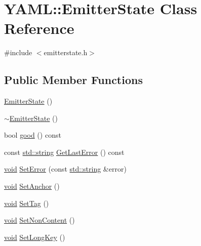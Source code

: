\hypertarget{class_y_a_m_l_1_1_emitter_state}{}\section{Y\+A\+ML\+::Emitter\+State Class Reference}
\label{class_y_a_m_l_1_1_emitter_state}


{\ttfamily \#include $<$emitterstate.\+h$>$}

\subsection*{Public Member Functions}
\begin{DoxyCompactItemize}
\item 
\mbox{\hyperlink{class_y_a_m_l_1_1_emitter_state_ac9eba8d70c7229ba9697176151d499f9}{Emitter\+State}} ()
\item 
\mbox{\hyperlink{class_y_a_m_l_1_1_emitter_state_a7d92e66b1ac2650bf35bb501180df068}{$\sim$\+Emitter\+State}} ()
\item 
bool \mbox{\hyperlink{class_y_a_m_l_1_1_emitter_state_a040193f3ac0fdb1c09987848196b02ce}{good}} () const
\item 
const \mbox{\hyperlink{glad_8h_ac83513893df92266f79a515488701770}{std\+::string}} \mbox{\hyperlink{class_y_a_m_l_1_1_emitter_state_a293a4e03db90d77554006dba84d05ab4}{Get\+Last\+Error}} () const
\item 
\mbox{\hyperlink{glad_8h_a950fc91edb4504f62f1c577bf4727c29}{void}} \mbox{\hyperlink{class_y_a_m_l_1_1_emitter_state_a215eac3f45cc35ccd2e42052a2724387}{Set\+Error}} (const \mbox{\hyperlink{glad_8h_ac83513893df92266f79a515488701770}{std\+::string}} \&error)
\item 
\mbox{\hyperlink{glad_8h_a950fc91edb4504f62f1c577bf4727c29}{void}} \mbox{\hyperlink{class_y_a_m_l_1_1_emitter_state_a26b4eebc3469aef4bb4727dd3570ffb9}{Set\+Anchor}} ()
\item 
\mbox{\hyperlink{glad_8h_a950fc91edb4504f62f1c577bf4727c29}{void}} \mbox{\hyperlink{class_y_a_m_l_1_1_emitter_state_aea17f20bb48bee16def826e27df033ab}{Set\+Tag}} ()
\item 
\mbox{\hyperlink{glad_8h_a950fc91edb4504f62f1c577bf4727c29}{void}} \mbox{\hyperlink{class_y_a_m_l_1_1_emitter_state_a50b3410c8739d81541bf290fc5f2f46b}{Set\+Non\+Content}} ()
\item 
\mbox{\hyperlink{glad_8h_a950fc91edb4504f62f1c577bf4727c29}{void}} \mbox{\hyperlink{class_y_a_m_l_1_1_emitter_state_a9dea01a26e208270dad3765a1788e16b}{Set\+Long\+Key}} ()

\end{DoxyCompactItemize}
